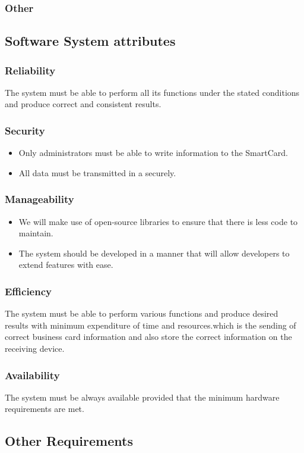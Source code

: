 \documentclass[english]{article}
\begin{document}
				 \subsubsection{Other}
				
					
									\newpage
				\subsection{Software System attributes}
				
				\subsubsection{Reliability}
    				The system must be able to perform all its functions under the stated conditions and produce correct and consistent results. 
    				
				
				\subsubsection{Security}
    					\begin{itemize}
					\item Only administrators must be able to write information to the SmartCard.
					\item All data must be transmitted in a securely.

					\end{itemize}
    				
				\subsubsection{Manageability}
					\begin{itemize}
							\item We will make use of open-source libraries to ensure that there is less code to maintain.
							\item The system should be developed in a manner that will allow developers to extend features with ease.
						\end{itemize}
	
				    
				\subsubsection{Efficiency}
				  The system must be able to perform various functions and produce desired results with minimum expenditure of time and resources.which is the sending of correct business card information and also store the correct information on the receiving device.
				\subsubsection{Availability}
	                          The system must be always available provided that the minimum hardware requirements are met.
				 
	
				
				

				\subsection{Other Requirements}
				

	
\end{document}
